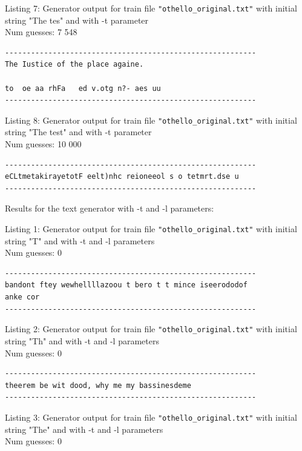 \documentclass{article}
\begin{document}
Listing 7: Generator output for train file \verb|"othello_original.txt"| with initial string "The tes" and with -t parameter
\\Num guesses: 7 548

\begin{lstlisting}
----------------------------------------------------------
The Iustice of the place againe.

to  oe aa rhFa   ed v.otg n?- aes uu
----------------------------------------------------------
\end{lstlisting}

Listing 8: Generator output for train file \verb|"othello_original.txt"| with initial string "The test" and with -t parameter
\\Num guesses: 10 000

\begin{lstlisting}
----------------------------------------------------------
eCLtmetakirayetotF eelt)nhc reioneeol s o tetmrt.dse u
----------------------------------------------------------
\end{lstlisting}


Results for the text generator with -t and -l parameters:


\hfill

Listing 1: Generator output for train file \verb|"othello_original.txt"| with initial string "T" and with -t and -l parameters
\\Num guesses: 0

\begin{lstlisting}
----------------------------------------------------------
bandont ftey wewhellllazoou t bero t t mince iseerododof  
anke cor
----------------------------------------------------------
\end{lstlisting}

Listing 2: Generator output for train file \verb|"othello_original.txt"| with initial string "Th" and with -t and -l parameters
\\Num guesses: 0

\begin{lstlisting}
----------------------------------------------------------
theerem be wit dood, why me my bassinesdeme
----------------------------------------------------------
\end{lstlisting}

Listing 3: Generator output for train file \verb|"othello_original.txt"| with initial string "The" and with -t and -l parameters
\\Num guesses: 0
\end{document}
